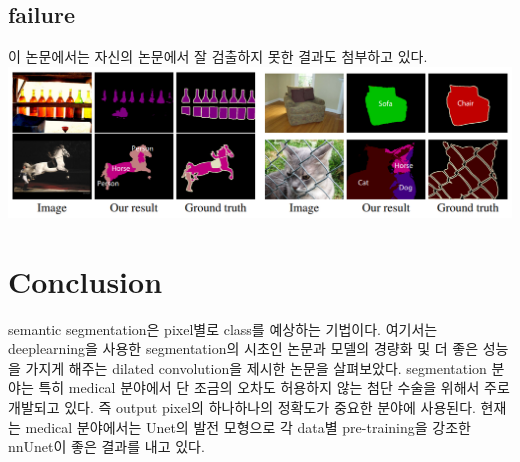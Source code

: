 \documentclass[extendedabs]{bmvc2k}
\begin{document}
 \subsection{failure}
 이 논문에서는 자신의 논문에서 잘 검출하지 못한 결과도 첨부하고 있다.
 \newline  \includegraphics[width=\linewidth]{images/08_D.PNG}
 
 \section{Conclusion}
 semantic segmentation은 pixel별로 class를 예상하는 기법이다. 여기서는 deeplearning을 사용한 segmentation의 시초인 논문과 모델의 경량화 및
 더 좋은 성능을 가지게 해주는 dilated convolution을 제시한 논문을 살펴보았다. segmentation 분야는 특히 medical 분야에서 단 조금의 오차도 허용하지 않는 
 첨단 수술을 위해서 주로 개발되고 있다. 즉 output pixel의 하나하나의 정확도가 중요한 분야에 사용된다. 현재는 medical 분야에서는 Unet의 발전 모형으로 
 각 data별 pre-training을 강조한 nnUnet\cite{isensee2018nnu}이 좋은 결과를 내고 있다.

\newpage

\end{document}
